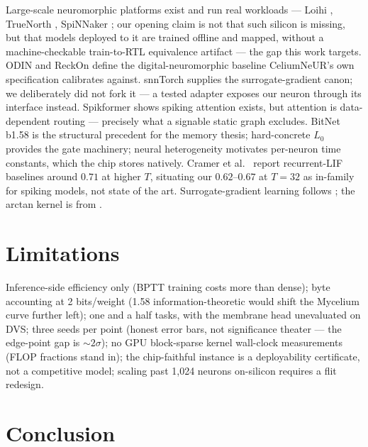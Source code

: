\documentclass[11pt]{article}
\begin{document}
Large-scale neuromorphic platforms exist and run real workloads ---
Loihi \cite{davies2018loihi}, TrueNorth \cite{merolla2014truenorth},
SpiNNaker \cite{furber2014spinnaker}; our opening claim is not that such
silicon is missing, but that models deployed to it are trained offline and
mapped, without a machine-checkable train-to-RTL equivalence artifact ---
the gap this work targets. ODIN \cite{frenkel2019odin} and ReckOn \cite{frenkel2022reckon} define the
digital-neuromorphic baseline CeliumNeUR's own specification calibrates
against. snnTorch \cite{eshraghian2023training} supplies the
surrogate-gradient canon; we deliberately did not fork it --- a tested
adapter exposes our neuron through its interface instead. Spikformer
\cite{zhou2023spikformer} shows spiking attention exists, but attention is
data-dependent routing --- precisely what a signable static graph excludes.
BitNet b1.58 \cite{ma2024bitnet} is the structural precedent for the memory
thesis; hard-concrete $L_0$ \cite{louizos2018learning} provides the gate
machinery; neural heterogeneity \cite{perez2021neural} motivates per-neuron
time constants, which the chip stores natively. Cramer et
al.~\cite{cramer2020heidelberg} report recurrent-LIF baselines around
$0.71$ at higher $T$, situating our $0.62$--$0.67$ at $T{=}32$ as in-family
for spiking models, not state of the art. Surrogate-gradient learning
follows \cite{neftci2019surrogate,zenke2021remarkable}; the arctan kernel is
from \cite{fang2021incorporating}.

\section{Limitations}

Inference-side efficiency only (BPTT training costs more than dense); byte
accounting at 2 bits/weight (1.58 information-theoretic would shift the
Mycelium curve further left); one and a half tasks, with the membrane head
unevaluated on DVS; three seeds per point (honest error bars, not
significance theater --- the edge-point gap is ${\sim}2\sigma$); no GPU
block-sparse kernel wall-clock measurements (FLOP fractions stand in); the
chip-faithful instance is a deployability certificate, not a competitive
model; scaling past 1{,}024 neurons on-silicon requires a flit redesign.

\section{Conclusion}
\end{document}
